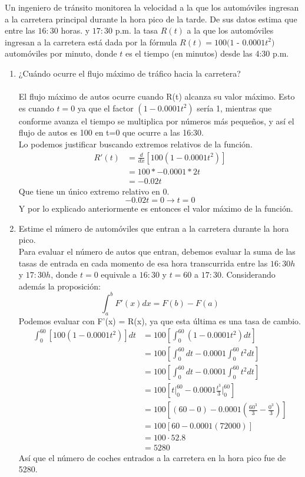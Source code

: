 \documentclass[12pt]{article}
\begin{document}
Un ingeniero de tránsito monitorea la velocidad a la que los automóviles ingresan a la carretera principal durante la hora pico de la tarde. De sus datos estima que entre las $16:30$ horas. y $17:30$ p.m. la tasa  $R(t)$ a la que los automóviles ingresan a la carretera está dada por la fórmula $R(t) = 100 (1$ - $0.0001t^2 )$ automóviles por minuto, donde $t$ es el tiempo (en minutos) desde las 4:30 p.m.
\begin{enumerate}[label=(\alph*)]
\item ¿Cuándo ocurre el flujo máximo de tráfico hacia la carretera?\\\\
  El flujo máximo de autos ocurre cuando R(t) alcanza su valor máximo. Esto es cuando $t=0$ ya que el factor  $(1 - 0.0001t^2 ) $ sería 1, mientras que conforme avanza el tiempo se multiplica por números más pequeños, y así el flujo de autos es 100 en t=0 que ocurre a las 16:30. \\
Lo podemos justificar buscando extremos relativos de la función.\\
  \begin{align*}
    R'(t)
    & = \frac{d}{dx} [100 (1 - 0.0001t^2 )] \\
    &= 100 *- 0.0001 * 2t\\
    & = -0.02t
  \end{align*}
  Que tiene un único extremo relativo en 0.
  \[ -0.02t = 0 \rightarrow t = 0 \]
  Y por lo explicado anteriormente es entonces el valor máximo de la función.
  
\item Estime el número de automóviles que entran a la carretera durante la hora pico.\\
  Para evaluar el número de autos que entran, debemos evaluar la suma de las tasas de entrada en cada momento de esa hora transcurrida entre las $16:30 h$ y $17:30 h$, donde  $t=0$ equivale a $16:30$ y $t=60$ a $17:30$. Considerando además la proposición:
  \[ \int_a^{b} F'(x)dx = F(b)-F(a)\]
Podemos evaluar con F'(x) = R(x), ya que esta última es una tasa de cambio.
\begin{align*}
  \int_0^{60} \left[ 100 (1- 0.0001t^2) \right] dt
  & = 100 \left[ \int_0^{60}  (1- 0.0001t^2) dt \right]\\
  & =  100 \left[ \int_0^{60}dt - 0.0001 \int_0^{60} t^2 dt \right]\\
  & =  100 \left[ \int_0^{60}dt - 0.0001 \int_0^{60} t^2 dt \right]\\
  & =  100 \left[ t \Bigg|_0 ^{60} - 0.0001 \frac {t^3}{3} \Bigg|_0 ^{60} \right]\\
  & =  100 \left[ (60-0) - 0.0001 \left( \frac {60^3}{3}  -  \frac {0^3}{3} \right) \right]\\
  & =  100 \left[ 60 - 0.0001 ( 72000 ) \right]\\
  & =  100 \cdot 52.8\\
  & =   5280
\end{align*}
Así que el número de coches entrados a la carretera en la hora pico fue de 5280.
\end{enumerate}
\end{document}
